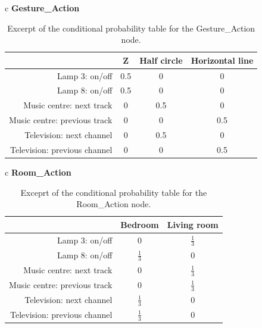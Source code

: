 \begin{table}[h!]
\centering
\caption{Excerpt of the conditional probability table for the Gesture\_Action node.}
\label{tbl:design:bayesian-network:cpt-gesture-action}
\begin{tabular}{c}
\textbf{Gesture\_Action}   \\
\begin{tabular}{r|ccc}
                             & Z   & Half circle & Horizontal line \\ \hline
Lamp 3: on/off               & 0.5 & 0             & 0                \\
Lamp 8: on/off               & 0.5 & 0             & 0                \\
Music centre: next track     & 0   & 0.5             & 0                \\
Music centre: previous track & 0   & 0             & 0.5              \\
Television: next channel     & 0   & 0.5             & 0                \\
Television: previous channel & 0   & 0             & 0.5              
\end{tabular}
\end{tabular}
\end{table}

\begin{table}[h!]
\centering
\caption{Exceprt of the conditional probability table for the Room\_Action node.}
\label{tbl:design:bayesian-network:cpt-room-action}
\begin{tabular}{c}
\textbf{Room\_Action}   \\
\begin{tabular}{r|cc}
                             & Bedroom & Living room \\ \hline
Lamp 3: on/off               & 0 & $\frac{1}{3}$ \\
Lamp 8: on/off               & $\frac{1}{3}$ & 0 \\
Music centre: next track     & 0   & $\frac{1}{3}$ \\
Music centre: previous track & 0    & $\frac{1}{3}$ \\
Television: next channel     & $\frac{1}{3}$   & 0  \\
Television: previous channel & $\frac{1}{3}$   & 0  \\
\end{tabular}
\end{tabular}
\end{table}

